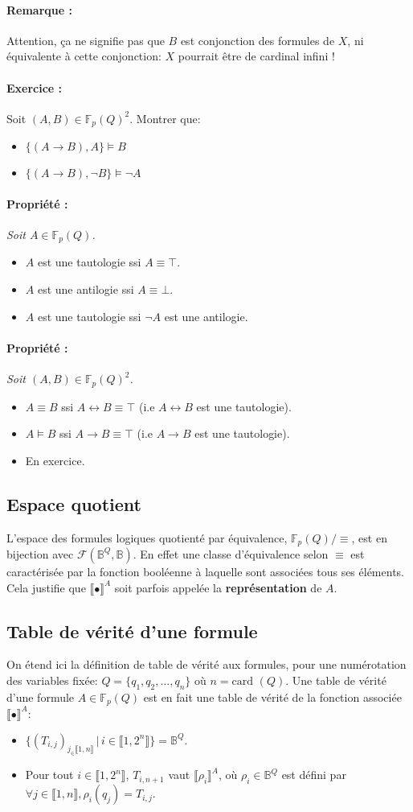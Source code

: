 \documentclass{scrartcl}
\newcounter{compteurExos}
\newcommand{\prop}[1]{\paragraph{Propriété : } \textsl{#1}\\}
\newcommand{\rem}[1]{\paragraph{Remarque : } #1\\}
\newcommand{\exo}[1]{\stepcounter{compteurExos} \paragraph{Exercice \thecompteurExos : } #1\\}
\newenvironment{demo}{\begin{itemize}[label=$\triangleright$]\item }{\end{itemize}}
\newcommand{\fpq}{\mathbb{F}_p(Q)}
\newcommand{\set}[1]{\{#1\}}
\newcommand{\tq}{\, \big| \,}
\newcommand{\intset}[1]{\llbracket #1 \rrbracket}
\newcommand{\card}{\text{card }}
\newcommand{\corrpar}{\vspace{-20pt}}
\begin{document}
			\rem{Attention, ça ne signifie pas que $B$ est conjonction des formules de $X$, ni équivalente à cette conjonction: $X$ pourrait être de cardinal infini !}
			\corrpar
			\exo{Soit $(A,B) \in \fpq^2$. Montrer que:}
			\begin{itemize}
				\item $\set{(A\rightarrow B), A} \vDash B$
				\item $\set{(A \rightarrow B), \neg B} \vDash \neg A$
			\end{itemize}

			\prop{Soit $A \in \fpq$.}
			\begin{itemize}
				\item $A$ est une tautologie ssi $A \equiv \top$.
				\item $A$ est une antilogie ssi $A \equiv \bot$.
				\item $A$ est une tautologie ssi $\neg A$ est une antilogie.
			\end{itemize}

			\prop{Soit $(A,B) \in \fpq^2$.}
			\begin{itemize}
				\item $A \equiv B$ ssi $A \leftrightarrow B \equiv \top$ (i.e $A \leftrightarrow B$ est une tautologie).
				\item $A \vDash B$ ssi $A \rightarrow B \equiv \top$ (i.e $A \rightarrow B$ est une tautologie).
			\end{itemize}
			\begin{demo}
				En exercice.
			\end{demo}

		\subsection{Espace quotient}
			L'espace des formules logiques quotienté par équivalence, $\fpq/\equiv$, est en bijection avec $\mathcal{F}(\mathbb{B}^Q,\mathbb{B})$.
			En effet une classe d'équivalence selon $\equiv$ est caractérisée par la fonction booléenne à laquelle sont associées tous ses éléments. 
			Cela justifie que $\llbracket\bullet\rrbracket^A$ soit parfois appelée la \textbf{représentation} de $A$.

		\subsection{Table de vérité d'une formule}
			On étend ici la définition de table de vérité aux formules, pour une numérotation des variables fixée: $Q = \set{q_1,q_2,...,q_n}$ où $n = \card(Q)$.
			Une table de vérité d'une formule $A \in \fpq$ est en fait une table de vérité de la fonction associée $\llbracket\bullet\rrbracket^A :$
			\\[-5pt]
			\begin{itemize}
				\item $\set{(T_{i,j})_{j_\in\intset{1,n}} \tq i\in \intset{1,2^n}} = \mathbb{B}^Q$.
				\item Pour tout $i \in \intset{1,2^n}$, $T_{i,n+1}$ vaut $\intset{\rho_i}^A$,
					où $\rho_i \in \mathbb{B}^Q$ est défini par $\forall j \in \intset{1,n}, \rho_i(q_j) = T_{i,j}$.
			\end{itemize}
			\vspace{5pt}
\end{document}
